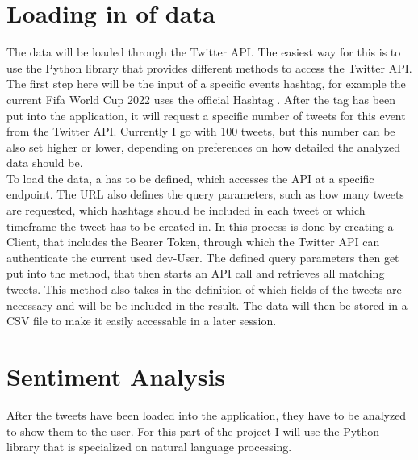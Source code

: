 \documentclass[a4paper,oneside,11pt]{scrreprt}
\begin{document}



\newpage


\chapter{Loading in of data}

The data will be loaded through the Twitter API. The easiest way for this is to use the Python library  that provides different methods to access the Twitter API. The first step here will be the input of a specific events hashtag, for example the current Fifa World Cup 2022 uses the official Hashtag . After the tag has been put into the application, it will request a specific number of tweets for this event from the Twitter API. Currently I go with 100 tweets, but this number can be also set higher or lower, depending on preferences on how detailed the analyzed data should be. \\

To load the data, a  has to be defined, which accesses the API at a specific endpoint. The URL also defines the query parameters, such as how many tweets are requested, which hashtags should be included in each tweet or which timeframe the tweet has to be created in. In  this process is done by creating a  Client, that includes the Bearer Token, through which the Twitter API can authenticate the current used dev-User. The defined query parameters then get put into the  method, that then starts an API call and retrieves all matching tweets. This method also takes in the definition of which fields of the tweets are necessary and will be be included in the result. The data will then be stored in a CSV file to make it easily accessable in a later session.


\chapter{Sentiment Analysis}

After the tweets have been loaded into the application, they have to be analyzed to show them to the user. For this part of the project I will use the Python library  that is specialized on natural language processing.
\end{document}
